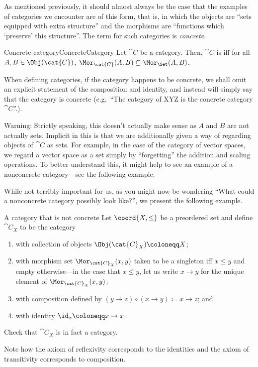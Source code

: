 As mentioned previously, it should almost always be the case that the examples of categories we encounter are of this form, that is, in which the objects are ``sets equipped with extra structure'' and the morphisms are ``functions which `preserve' this structure''.  The term for such categories is \emph{concrete}.
\begin{dfn}{Concrete category}{ConcreteCategory}
Let $\cat{C}$ be a category.  Then, $\cat{C}$ is  iff for all $A,B\in \Obj (\cat{C})$, $\Mor _{\cat{C}}(A,B)\subseteq \Mor _{\Set}(A,B)$.
\begin{rmk}
When defining categories, if the category happens to be concrete, we shall omit an explicit statement of the composition and identity, and instead will simply say that the category is concrete (e.g.~``The category of XYZ is the concrete category $\cat{C}$\textellipsis ''.).
\end{rmk}
\begin{rmk}
Warning:  Strictly speaking, this doesn't actually make sense as $A$ and $B$ are not actually sets.  Implicit in this is that we are additionally given a way of regarding objects of $\cat{C}$ as sets.  For example, in the case of the category of vector spaces, we regard a vector space as a set simply by ``forgetting'' the addition and scaling operations.  To better understand this, it might help to see an example of a nonconcrete category---see the following example.
\end{rmk}
\end{dfn}
While not terribly important for us, as you might now be wondering ``What could a nonconcrete category possibly look like?'', we present the following example.
\begin{exm}{A category that is not concrete}{}
Let $\coord{X,\leq}$ be a preordered set and define $\cat{C}_X$ to be the category
\begin{enumerate}
\item with collection of objects $\Obj (\cat{C}_X)\coloneqq X$;
\item with morphism set $\Mor _{\cat{C}_X}(x,y)$  taken to be a singleton iff $x\leq y$ and empty otherwise---in the case that $x\leq y$, let us write $x\rightarrow y$ for the unique element of $\Mor _{\cat{C}_X}(x,y)$;
\item with composition defined by $(y\rightarrow z)\circ (x\rightarrow y)\coloneqq x\rightarrow z$; and
\item with identity $\id _x\coloneqq x\rightarrow x$.
\end{enumerate}
\begin{exr}{}{}
Check that $\cat{C}_X$ is in fact a category.
\begin{rmk}
Note how the axiom of reflexivity corresponds to the identities and the axiom of transitivity corresponds to composition.
\end{rmk}
\end{exr}
\end{exm}

